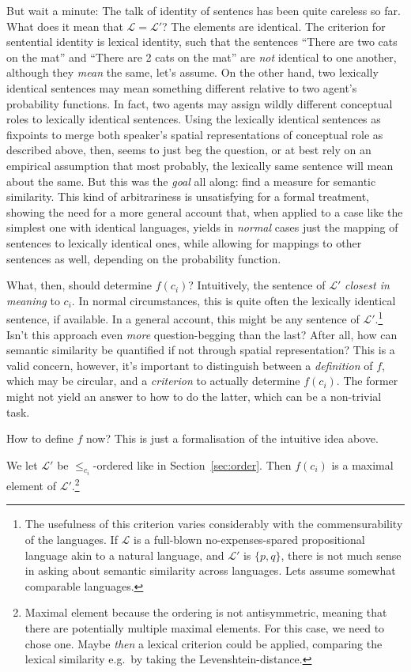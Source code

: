 \documentclass[11pt, a4paper]{scrartcl}
\renewcommand{\i}[1]{\emph{#1}}
\renewcommand{\L}{\mathcal{L}}
\begin{document}
But wait a minute: The talk of identity of sentencs has been quite careless so far. What does it mean that $\L = \L'$? The elements are identical. The criterion for sentential identity is lexical identity, such that the sentences ``There are two cats on the mat'' and ``There are 2 cats on the mat'' are \i{not} identical to one another, although they \i{mean} the same, let's assume. On the other hand, two lexically identical sentences may mean something different relative to two agent's probability functions. In fact, two agents may assign wildly different conceptual roles to lexically identical sentences. Using the lexically identical sentences as fixpoints to merge both speaker's spatial representations of conceptual role as described above, then, seems to just beg the question, or at best rely on an empirical assumption that most probably, the lexically same sentence will mean about the same. But this was the \i{goal} all along: find a measure for semantic similarity. This kind of arbitrariness is unsatisfying for a formal treatment, showing the need for a more general account that, when applied to a case like the simplest one with identical languages, yields in \i{normal} cases just the mapping of sentences to lexically identical ones, while allowing for mappings to other sentences as well, depending on the probability function.

What, then, should determine $f(c_i)$? Intuitively, the sentence of $\L'$ \i{closest in meaning} to $c_i$. In normal circumstances, this is quite often the lexically identical sentence, if available. In a general account, this might be any sentence of $\L'$.\footnote{The usefulness of this criterion varies considerably with the commensurability of the languages. If $\L$ is a full-blown no-expenses-spared propositional language akin to a natural language, and $\L'$ is $\{p, q\}$, there is not much sense in asking about semantic similarity across languages. Lets assume somewhat comparable languages.} Isn't this approach even \i{more} question-begging than the last? After all, how can semantic similarity be quantified if not through spatial representation? This is a valid concern, however, it's important to distinguish between a \i{definition} of $f$, which may be circular, and a \i{criterion} to actually determine $f(c_i)$. The former might not yield an answer to how to do the latter, which can be a non-trivial task.

How to define $f$ now? This is just a formalisation of the intuitive idea above. 

We let $\L'$ be $\leqslant_{c_i}$-ordered like in Section~\ref{sec:order}. Then $f(c_i)$ is a maximal element of $\L'$.\footnote{Maximal element because the ordering is not antisymmetric, meaning that there are potentially multiple maximal elements. For this case, we need to chose one. Maybe \i{then} a lexical criterion could be applied, comparing the lexical similarity e.g.\ by taking the Levenshtein-distance.} 
\end{document}
